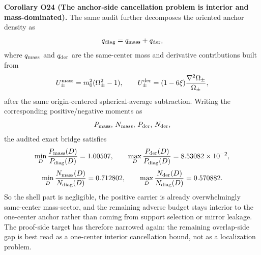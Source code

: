 \documentclass[aps,prd,onecolumn,notitlepage,nofootinbib,superscriptaddress,11pt,floatfix]{revtex4-2}
\begin{document}
\medskip\noindent\textbf{Corollary O24 (The anchor-side cancellation problem is interior and mass-dominated).}
The same audit further decomposes the oriented anchor density as
\[
q_{\rm diag}=q_{\rm mass}+q_{\rm der},
\]
where \(q_{\rm mass}\) and \(q_{\rm der}\) are the same-center mass and derivative contributions built from
\[
U_{\pm}^{\rm mass}=m_0^2(\Omega_\pm^2-1),
\qquad
U_{\pm}^{\rm der}=(1-6\xi)\frac{\nabla^2\Omega_\pm}{\Omega_\pm},
\]
after the same origin-centered spherical-average subtraction. Writing the corresponding positive/negative moments as
\[
P_{\rm mass},\,N_{\rm mass},\,P_{\rm der},\,N_{\rm der},
\]
the audited exact bridge satisfies
\[
\min_D \frac{P_{\rm mass}(D)}{P_{\rm diag}(D)}=1.00507,
\qquad
\max_D \frac{P_{\rm der}(D)}{P_{\rm diag}(D)}=8.53082\times10^{-2},
\]
\[
\min_D \frac{N_{\rm mass}(D)}{N_{\rm diag}(D)}=0.712802,
\qquad
\max_D \frac{N_{\rm der}(D)}{N_{\rm diag}(D)}=0.570882.
\]
So the shell part is negligible, the positive carrier is already overwhelmingly same-center mass-sector, and the remaining adverse budget stays interior to the one-center anchor rather than coming from support selection or mirror leakage. The proof-side target has therefore narrowed again: the remaining overlap-side gap is best read as a one-center interior cancellation bound, not as a localization problem.
\end{document}
